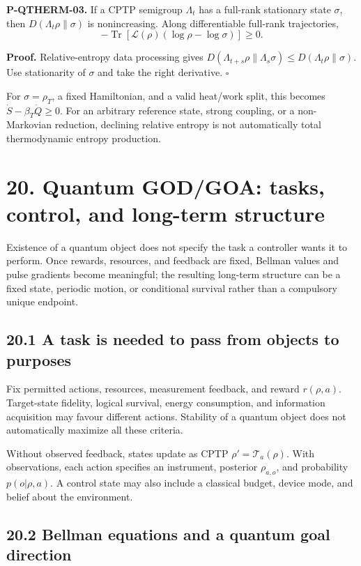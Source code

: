 \documentclass[
  11pt,
  oneside]{book}
\begin{document}
\label{p-qtherm-03}{}

\textbf{P-QTHERM-03.} If a CPTP semigroup \(\Lambda_t\) has a full-rank
stationary state \(\sigma\), then \(D(\Lambda_t\rho\|\sigma)\) is
nonincreasing. Along differentiable full-rank trajectories, \[
-\operatorname{Tr}[\mathcal L(\rho)(\log\rho-\log\sigma)]\ge0.
\]

\textbf{Proof.} Relative-entropy data processing gives
\(D(\Lambda_{t+s}\rho\|\Lambda_s\sigma)
\le D(\Lambda_t\rho\|\sigma)\). Use stationarity of \(\sigma\) and take
the right derivative. \(\square\)

For \(\sigma=\rho_T\), a fixed Hamiltonian, and a valid heat/work split,
this becomes \(\dot S-\beta_T\dot Q\ge0\). For an arbitrary reference
state, strong coupling, or a non-Markovian reduction, declining relative
entropy is not automatically total thermodynamic entropy production.

\chapter{20. Quantum GOD/GOA: tasks, control, and long-term
structure}\label{ch-20}

Existence of a quantum object does not specify the task a controller
wants it to perform. Once rewards, resources, and feedback are fixed,
Bellman values and pulse gradients become meaningful; the resulting
long-term structure can be a fixed state, periodic motion, or
conditional survival rather than a compulsory unique endpoint.

\section{20.1 A task is needed to pass from objects to purposes}

Fix permitted actions, resources, measurement feedback, and reward
\(r(\rho,a)\). Target-state fidelity, logical survival, energy
consumption, and information acquisition may favour different actions.
Stability of a quantum object does not automatically maximize all these
criteria.

Without observed feedback, states update as CPTP
\(\rho'=\mathcal T_a(\rho)\). With observations, each action specifies
an instrument, posterior \(\rho_{a,o}\), and probability
\(p(o|\rho,a)\). A control state may also include a classical budget,
device mode, and belief about the environment.

\section{20.2 Bellman equations and a quantum goal direction}
\end{document}

